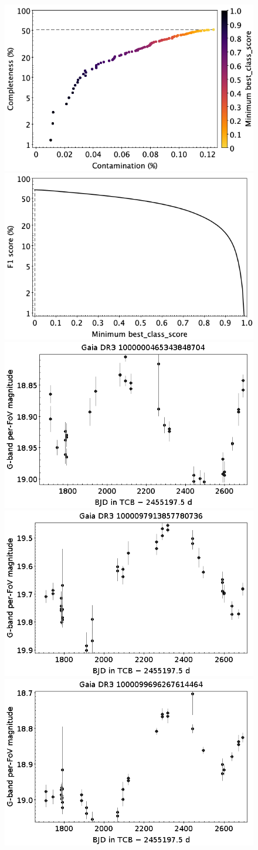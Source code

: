 \documentclass[longauth]{aa}
\begin{document}
\begin{appendix}
\begin{figure}
\centering
{} \includegraphics[width=0.45\hsize]{figures/appendix/AGN_cls_scc.png}  
\hspace{2mm}
 \includegraphics[width=0.45\hsize]{figures/appendix/AGN_cls_sf1.png} \\ 
\vspace{4mm}
 \includegraphics[width=0.45\hsize]{figures/appendix/AGN-1.png}  
\hspace{2mm}
 \includegraphics[width=0.45\hsize]{figures/appendix/AGN-18.png} \\
\vspace{4mm}
 \includegraphics[width=0.45\hsize]{figures/appendix/AGN-19.png}  

\end{figure}
\end{appendix}
\end{document}
